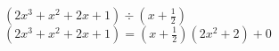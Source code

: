 {$\left(2x^3+x^2+2x+1 \right) \div \left(x + \frac{1}{2} \right)$}
{$\left(2x^3+x^2+2x+1 \right) = \left(x + \frac{1}{2} \right)\left(2x^2+2\right)+0$}